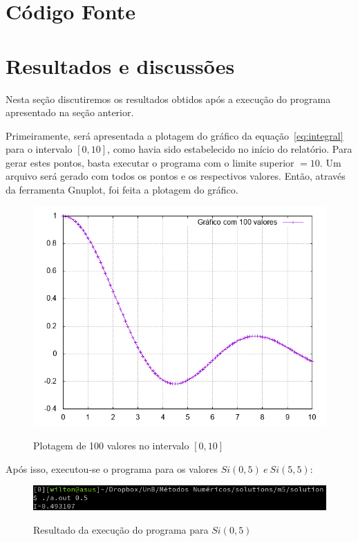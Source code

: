 \documentclass[12pt, hidelinks]{article}
\begin{document}
\newpage
\section{Código Fonte}\label{sec:codigofonte}



\newpage
\section{Resultados e discussões}

Nesta seção discutiremos os resultados obtidos após a execução do programa apresentado na seção anterior.

Primeiramente, será apresentada a plotagem do gráfico da equação~\eqref{eq:integral} para o intervalo $[0, 10]$, como havia sido estabelecido no início do relatório. Para gerar estes pontos, basta executar o programa com o limite superior $= 10$. Um arquivo será gerado com todos os pontos e os respectivos valores. Então, através da ferramenta Gnuplot, foi feita a plotagem do gráfico.
\begin{figure}[!h]
  \centering
  \includegraphics[width=15cm]{figuras/graph.png}\\
  \caption{Plotagem de 100 valores no intervalo $[0,10]$ }\label{fig:graph}
\end{figure}
\newpage
Após isso, executou-se o programa para os valores $Si(0,5)~e~Si(5,5)$:
\begin{figure}[!h]
  \centering
  \includegraphics[width=15cm]{figuras/si05.png}\\
  \caption{Resultado da execução do programa para $Si(0,5)$}\label{fig:printro13}
\end{figure}
\end{document}
